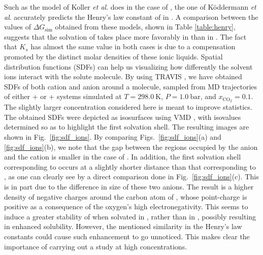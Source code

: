 \documentclass[3p,twocolumn]{elsarticle}
\begin{document}
Such as the model of Koller \textit{et al}. \cite{Koller_2012} does in the case of \ce{[emim][B(CN)_4]}, the one of K\"{o}ddermann \textit{et al}. \cite{Koddermann_2007} accurately predicts the Henry's law constant of  in \ce{[emim][NTf_2]}.
A comparison between the values of $\Delta G_\text{sim}$ obtained from these models, shown in Table \ref{table:henry}, suggests that the solvation of  takes place more favorably in \ce{[emim][B(CN)_4]} than in \ce{[emim][NTf_2]}.
The fact that $K_s$ has almost the same value in both cases is due to a compensation promoted by the distinct molar densities of these ionic liquids.
Spatial distribution functions (SDFs) \cite{Svishchev_1993} can help us visualizing how differently the solvent ions interact with the solute molecule.
By using TRAVIS \cite{Brehm_2011}, we have obtained SDFs of both cation and anion around a  molecule, sampled from MD trajectories of either +\ce{[emim][B(CN)_4]} or +\ce{[emim][NTf_2]} systems simulated at $T = 298.0~\text{K}$, $P = 1.0~\mathrm{bar}$, and $x_\mathrm{CO_2} = 0.1$.
The slightly larger  concentration considered here is meant to improve statistics.
The obtained SDFs were depicted as isosurfaces using VMD \cite{HUMP96}, with isovalues determined so as to highlight the first solvation shell.
The resulting images are shown in Fig.~\ref{fig:sdf_ions}.
By comparing Figs.~\ref{fig:sdf_ions}(a) and \ref{fig:sdf_ions}(b), we note that the gap between the regions occupied by the anion and the cation is smaller in the case of \ce{[emim][B(CN)_4]}.
In addition, the first solvation shell corresponding to \ce{[B(CN)_4]^-} occurs at a slightly shorter distance than that corresponding to \ce{[NTf_2]^-}, as one can clearly see by a direct comparison done in Fig.~\ref{fig:sdf_ions}(c).
This is in part due to the difference in size of these two anions.
The result is a higher density of negative charges around the carbon atom of , whose point-charge is positive as a consequence of the oxygen's high electronegativity.
This seems to induce a greater stability of  when solvated in \ce{[emim][B(CN)_4]}, rather than in \ce{[emim][NTf_2]}, possibly resulting in enhanced solubility.
However, the mentioned similarity in the Henry's law constants could cause such enhancement to go unnoticed.
This makes clear the importance of carrying out a study at high  concentrations.
\end{document}
